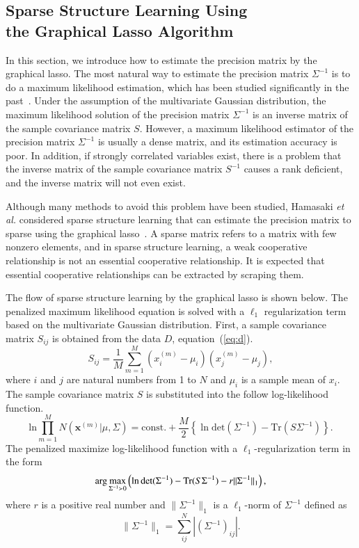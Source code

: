 \documentclass[letterpaper]{sig-alternate-10pt}
\begin{document}
\subsection{Sparse Structure Learning Using \\the Graphical Lasso Algorithm}
In this section, we introduce how to estimate the precision matrix by the graphical lasso.
The most natural way to estimate the precision matrix $\Sigma^{-1}$ is to do a maximum likelihood estimation, which has been studied significantly in the past~\cite{Dempster, Meinshausen}.
Under the assumption of the multivariate Gaussian distribution, the maximum likelihood solution of the precision matrix $\Sigma^{-1}$ is an inverse matrix of the sample covariance matrix $S$.
However, a maximum likelihood estimator of the precision matrix $\Sigma^{-1}$ is usually a dense matrix, and its estimation accuracy is poor.
In addition, if strongly correlated variables exist, there is a problem that the inverse matrix of the sample covariance matrix $S^{-1}$ causes a rank deficient, and the inverse matrix will not even exist.

Although many methods to avoid this problem have been studied, Hamasaki {\it et al.} considered sparse structure learning that can estimate the precision matrix to sparse using the graphical lasso~\cite{Friedman}.
A sparse matrix refers to a matrix with few nonzero elements, and in sparse structure learning, a weak cooperative relationship is not an essential cooperative relationship.
It is expected that essential cooperative relationships can be extracted by scraping them.

The flow of sparse structure learning by the graphical lasso is shown below.
The penalized maximum likelihood equation is solved with a $\ell_1$ regularization term based on the multivariate Gaussian distribution.
First, a sample covariance matrix $S_{ij}$ is obtained from the data $D$, equation~(\ref{eq:d}).
\begin{equation}
\label{eq:s}
S_{ij}=\frac{1}{M}\sum_{m=1}^{M}(x_{i}^{(m)}-\mu_{i})(x_{j}^{(m)}-\mu_{j}),
\end{equation}
where $i$ and $j$ are natural numbers from 1 to $N$ and $\mu_i$ is a sample mean of $x_i$.
The sample covariance matrix $S$ is substituted into the follow log-likelihood function.
\begin{equation*}
\mathrm{ln}{\prod_{m=1}^{M}}{N(\bm{x}^{(m)}|\mu,\Sigma)}=\mbox{const.}+\frac{M}{2}\left\{{\ln\mathrm{det}(\Sigma^{-1})}-\mathrm{Tr}(S\Sigma^{-1})\right\}.
\end{equation*}
The penalized maximize log-likelihood function with a $\ell_1$-regularization term in the form
\begin{equation}
\label{eq:max}
{\rm arg}\mathop{\rm max}\limits_{\Sigma^{-1} \succ 0} \left({\ln\mathrm{det}(\Sigma^{-1})}-\mathrm{Tr}(S\Sigma^{-1})-r||\Sigma^{-1}||_{1}\right),
\end{equation}
where $r$ is a positive real number and $\|\Sigma^{-1}\|_{1}$ is a $\ell_1$-norm of $\Sigma^{-1}$ defined as
\begin{equation*}
	\|\Sigma^{-1}\|_{1}={\sum_{ij}^{N}}|(\Sigma^{-1})_{ij}|.
\end{equation*}
\end{document}
